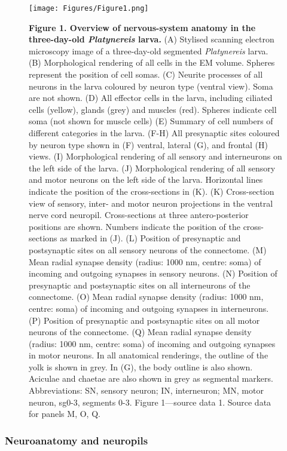 \documentclass[
  11pt,
]{article}
\begin{document}
\begin{figure}[H]

{\centering \texttt{[image: Figures/Figure1.png]}

}

\caption{\textbf{Figure 1. Overview of nervous-system anatomy in the
three-day-old \emph{Platynereis} larva.} (A) Stylised scanning electron
microscopy image of a three-day-old segmented \emph{Platynereis} larva.
(B) Morphological rendering of all cells in the EM volume. Spheres
represent the position of cell somas. (C) Neurite processes of all
neurons in the larva coloured by neuron type (ventral view). Soma are
not shown. (D) All effector cells in the larva, including ciliated cells
(yellow), glands (grey) and muscles (red). Spheres indicate cell soma
(not shown for muscle cells) (E) Summary of cell numbers of different
categories in the larva. (F-H) All presynaptic sites coloured by neuron
type shown in (F) ventral, lateral (G), and frontal (H) views. (I)
Morphological rendering of all sensory and interneurons on the left side
of the larva. (J) Morphological rendering of all sensory and motor
neurons on the left side of the larva. Horizontal lines indicate the
position of the cross-sections in (K). (K) Cross-section view of
sensory, inter- and motor neuron projections in the ventral nerve cord
neuropil. Cross-sections at three antero-posterior positions are shown.
Numbers indicate the position of the cross-sections as marked in (J).
(L) Position of presynaptic and postsynaptic sites on all sensory
neurons of the connectome. (M) Mean radial synapse density (radius: 1000
nm, centre: soma) of incoming and outgoing synapses in sensory neurons.
(N) Position of presynaptic and postsynaptic sites on all interneurons
of the connectome. (O) Mean radial synapse density (radius: 1000 nm,
centre: soma) of incoming and outgoing synapses in interneurons. (P)
Position of presynaptic and postsynaptic sites on all motor neurons of
the connectome. (Q) Mean radial synapse density (radius: 1000 nm,
centre: soma) of incoming and outgoing synapses in motor neurons. In all
anatomical renderings, the outline of the yolk is shown in grey. In (G),
the body outline is also shown. Aciculae and chaetae are also shown in
grey as segmental markers. Abbreviations: SN, sensory neuron; IN,
interneuron; MN, motor neuron, sg0-3, segments 0-3. Figure 1---source
data 1. Source data for panels M, O, Q.}

\end{figure}%

\subsubsection{Neuroanatomy and
neuropils}\label{neuroanatomy-and-neuropils}
\end{document}
